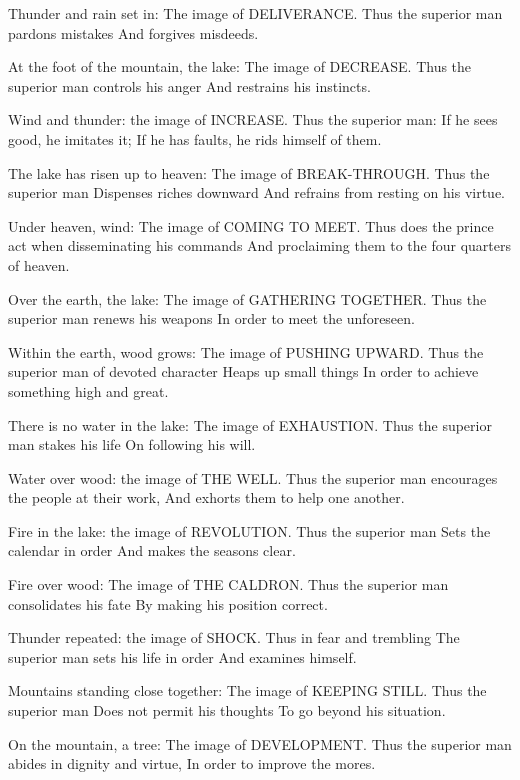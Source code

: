 {Thunder and rain set in:
 The image of DELIVERANCE.
 Thus the superior man pardons mistakes
 And forgives misdeeds.}

{At the foot of the mountain, the lake:
 The image of DECREASE.
 Thus the superior man controls his anger
 And restrains his instincts.}

{Wind and thunder: the image of
 INCREASE.
 Thus the superior man:
 If he sees good, he imitates it;
 If he has faults, he rids himself of them.}

{The lake has risen up to heaven:
 The image of BREAK-THROUGH.
 Thus the superior man
 Dispenses riches downward
 And refrains from resting on his virtue.}

{Under heaven, wind:
 The image of COMING TO MEET.
 Thus does the prince act when disseminating his commands
 And proclaiming them to the four quarters of heaven.}

{Over the earth, the lake:
 The image of GATHERING TOGETHER.
 Thus the superior man renews his weapons
 In order to meet the unforeseen.}

{Within the earth, wood grows:
 The image of PUSHING UPWARD.
 Thus the superior man of devoted character
 Heaps up small things
 In order to achieve something high and great.}

{There is no water in the lake:
 The image of EXHAUSTION.
 Thus the superior man stakes his life
 On following his will.}

{Water over wood: the image of THE WELL.
 Thus the superior man encourages the people at their work,
 And exhorts them to help one another.}

{Fire in the lake: the image of
 REVOLUTION.
 Thus the superior man
 Sets the calendar in order
 And makes the seasons clear.}

{Fire over wood:
 The image of THE CALDRON.
 Thus the superior man consolidates his fate
 By making his position correct.}

{Thunder repeated: the image of SHOCK.
 Thus in fear and trembling
 The superior man sets his life in order
 And examines himself.}

{Mountains standing close together:
 The image of KEEPING STILL.
 Thus the superior man
 Does not permit his thoughts
 To go beyond his situation.}

{On the mountain, a tree:
 The image of DEVELOPMENT.
 Thus the superior man abides in dignity and virtue,
 In order to improve the mores.}

